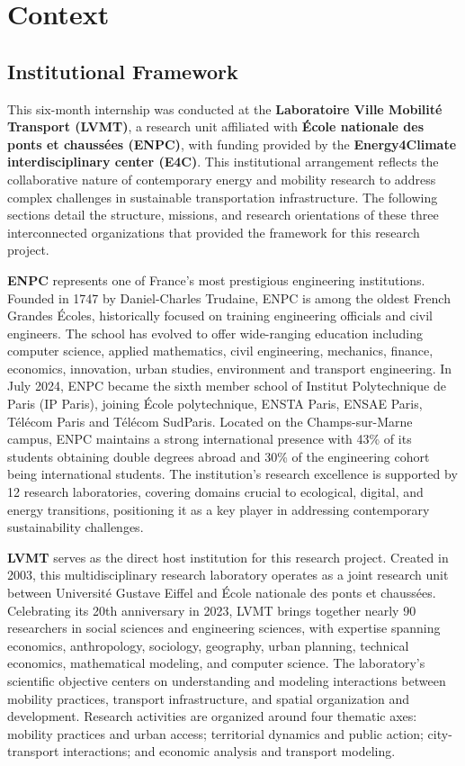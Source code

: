 \chapter{Context}\label{chap2}

\section{Institutional Framework}
This six-month internship was conducted at the \textbf{Laboratoire Ville Mobilité Transport (LVMT)}, a research unit affiliated with \textbf{École nationale des ponts et chaussées (ENPC)}, with funding provided by the \textbf{Energy4Climate interdisciplinary center (E4C)}. This institutional arrangement reflects the collaborative nature of contemporary energy and mobility research to address complex challenges in sustainable transportation infrastructure. The following sections detail the structure, missions, and research orientations of these three interconnected organizations that provided the framework for this research project.

\textbf{ENPC} represents one of France's most prestigious engineering institutions. Founded in 1747 by Daniel-Charles Trudaine, ENPC is among the oldest French Grandes Écoles, historically focused on training engineering officials and civil engineers. The school has evolved to offer wide-ranging education including computer science, applied mathematics, civil engineering, mechanics, finance, economics, innovation, urban studies, environment and transport engineering. In July 2024, ENPC became the sixth member school of Institut Polytechnique de Paris (IP Paris), joining École polytechnique, ENSTA Paris, ENSAE Paris, Télécom Paris and Télécom SudParis.
Located on the Champs-sur-Marne campus, ENPC maintains a strong international presence with 43\% of its students obtaining double degrees abroad and 30\% of the engineering cohort being international students. The institution's research excellence is supported by 12 research laboratories, covering domains crucial to ecological, digital, and energy transitions, positioning it as a key player in addressing contemporary sustainability challenges.

\textbf{LVMT} serves as the direct host institution for this research project. Created in 2003, this multidisciplinary research laboratory operates as a joint research unit between Université Gustave Eiffel and École nationale des ponts et chaussées. Celebrating its 20th anniversary in 2023, LVMT brings together nearly 90 researchers in social sciences and engineering sciences, with expertise spanning economics, anthropology, sociology, geography, urban planning, technical economics, mathematical modeling, and computer science.
The laboratory's scientific objective centers on understanding and modeling interactions between mobility practices, transport infrastructure, and spatial organization and development. Research activities are organized around four thematic axes: mobility practices and urban access; territorial dynamics and public action; city-transport interactions; and economic analysis and transport modeling. 

